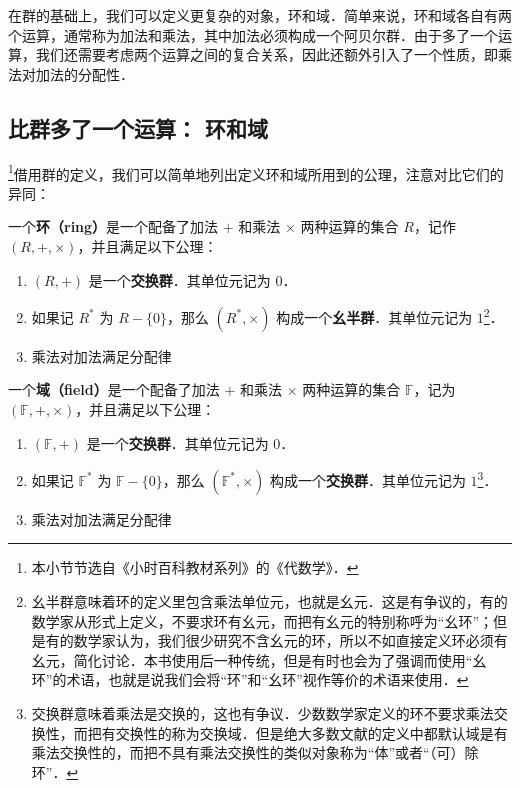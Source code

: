 

在群的基础上，我们可以定义更复杂的对象，环和域．简单来说，环和域各自有两个运算，通常称为加法和乘法，其中加法必须构成一个阿贝尔群．由于多了一个运算，我们还需要考虑两个运算之间的复合关系，因此还额外引入了一个性质，即乘法对加法的分配性．

\subsection{比群多了一个运算： 环和域}

\footnote{本小节节选自《小时百科教材系列》的《代数学》．}借用群的定义，我们可以简单地列出定义环和域所用到的公理，注意对比它们的异同：

\begin{definition}{}
一个\textbf{环（ring）}是一个配备了加法 $+$ 和乘法 $\times$ 两种运算的集合 $R$，记作 $(R, +, \times)$，并且满足以下公理：
\begin{enumerate}
    \item $(R, +)$ 是一个\textbf{交换群}．其单位元记为 $0$．
    \item 如果记 $R^*$ 为 $R-\{0\}$，那么 $(R^*, \times)$ 构成一个\textbf{幺半群}．其单位元记为 $1$\footnote{幺半群意味着环的定义里包含乘法单位元，也就是幺元．这是有争议的，有的数学家从形式上定义，不要求环有幺元，而把有幺元的特别称呼为“幺环”；但是有的数学家认为，我们很少研究不含幺元的环，所以不如直接定义环必须有幺元，简化讨论．本书使用后一种传统，但是有时也会为了强调而使用“幺环”的术语，也就是说我们会将“环”和“幺环”视作等价的术语来使用．}．
    \item 乘法对加法满足分配律
\end{enumerate}
\end{definition}

\begin{definition}{}
一个\textbf{域（field）}是一个配备了加法 $+$ 和乘法 $\times$ 两种运算的集合 $\mathbb{F}$，记为 $(\mathbb{F}, +, \times)$，并且满足以下公理：

\begin{enumerate}
    \item $(\mathbb{F}, +)$ 是一个\textbf{交换群}．其单位元记为 $0$．
    \item 如果记 $\mathbb{F}^*$ 为 $\mathbb{F}-\{0\}$，那么 $(\mathbb{F}^*, \times)$ 构成一个\textbf{交换群}．其单位元记为 $1$\footnote{交换群意味着乘法是交换的，这也有争议．少数数学家定义的环不要求乘法交换性，而把有交换性的称为交换域．但是绝大多数文献的定义中都默认域是有乘法交换性的，而把不具有乘法交换性的类似对象称为“体”或者“（可）除环”．}．
    \item 乘法对加法满足分配律
\end{enumerate}
\end{definition}



